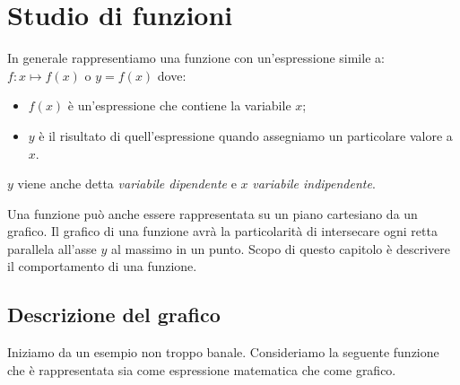 


% 

% 

\chapter{Studio di funzioni}

In generale rappresentiamo una funzione con un'espressione simile 
a:~\(f: x \mapsto f(x)\) o \(y = f(x)\) dove:
\begin{itemize} [nosep]
 \item \(f(x)\) è un'espressione che contiene la variabile \(x\);
 \item \(y\) è il risultato di quell'espressione quando assegniamo un 
particolare valore a \(x\). 
\end{itemize}

\vspace{-.5em}
\begin{center}
\textbf{\(y\)} viene anche detta \emph{variabile dipendente} e 
\textbf{\(x\)} \emph{variabile indipendente}.
\end{center}
\vspace{-.5em}

Una funzione può anche essere rappresentata su un piano cartesiano da un 
grafico. 
Il grafico di una funzione avrà la particolarità di intersecare ogni retta 
parallela all'asse \(y\) al massimo in un punto.
Scopo di questo capitolo è descrivere il comportamento di una funzione.

\section{Descrizione del grafico}
\label{sec:descrizione_grafico}
Iniziamo da un esempio non troppo banale. 
Consideriamo la seguente funzione che è rappresentata sia come espressione 
matematica che come grafico.


